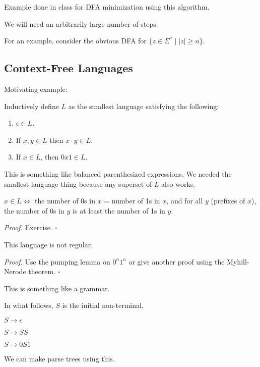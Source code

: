 \documentclass[a4paper]{article}
\newenvironment{proof}{\begin{breakbox}\textit{Proof.}}{\hfill$\square$\end{breakbox}}
\begin{document}
Example done in class for DFA minimization using this algorithm.

We will need an arbitrarily large number of steps.

For an example, consider the obvious DFA for $\{z \in \Sigma^* \mid |z| \ge n\}$.

\subsection{Context-Free Languages}

Motivating example:

\begin{eg}
    Inductively define $L$ as the smallest language satisfying the following:
    \begin{enumerate}
        \item $\epsilon \in L$.
        \item If $x, y \in L$ then $x \cdot y \in L$.
        \item If $x \in L$, then $0x1 \in L$.
    \end{enumerate}
\end{eg}

\begin{note}
    This is something like balanced parenthesized expressions. We needed the smallest language thing because any superset of $L$ also works.
\end{note}

\begin{claim}
    $x \in L \iff $ the number of 0s in $x$ = number of 1s in $x$, and for all $y$ (prefixes of $x$), the number of 0s in $y$ is at least the number of 1s in $y$.
\end{claim}

\begin{proof}
    Exercise.
\end{proof}

\begin{claim}
    This language is not regular.
\end{claim}

\begin{proof}
    Use the pumping lemma on $0^n 1^n$ or give another proof using the Myhill-Nerode theorem.
\end{proof}

This is something like a grammar.

In what follows, $S$ is the initial non-terminal.

$S \to \epsilon$

$S \to SS$

$S \to 0S1$

We can make parse trees using this.
\end{document}
